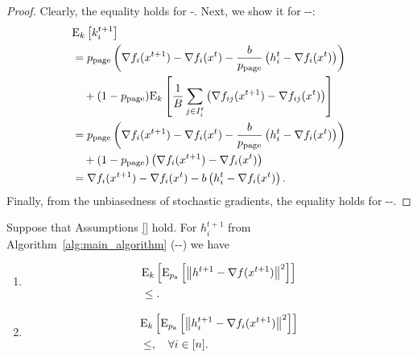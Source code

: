 \documentclass{article}
\begin{document}
\begin{proof}
  Clearly, the equality holds for -. Next, we show it for --:
  \begin{align*}
    &{\rm E}_{k}\left[k^{t+1}_i\right] \\
    &= p_{\text{page}} \left(\nabla f_i(x^{t+1}) - \nabla f_i(x^{t}) - \frac{b}{p_{\text{page}}} \left(h^t_i - \nabla f_i(x^{t})\right)\right) \\
    &\quad + (1 - p_{\text{page}}) {\rm E}_{k}\left[\frac{1}{B}\sum_{j \in I^t_i}\left(\nabla f_{ij}(x^{t+1}) - \nabla f_{ij}(x^{t})\right)\right] \\
    &= p_{\text{page}} \left(\nabla f_i(x^{t+1}) - \nabla f_i(x^{t}) - \frac{b}{p_{\text{page}}} \left(h^t_i - \nabla f_i(x^{t})\right)\right) \\
    &\quad + (1 - p_{\text{page}}) \left(\nabla f_i(x^{t+1}) - \nabla f_i(x^{t})\right) \\
    &= \nabla f_i(x^{t+1}) - \nabla f_i(x^{t}) - b \left(h^t_i - \nabla f_i(x^{t})\right).
\end{align*}
Finally, from the unbiasedness of stochastic gradients, the equality holds for --.
\end{proof}

\begin{lemma}
  Suppose that Assumptions \ref{} hold. For $h^{t+1}_i$ from Algorithm~\ref{alg:main_algorithm} (--) we have
  \begin{enumerate}
  \item
      \begin{align*}
          &{\rm E}_{k}\left[{\rm E}_{p_{\textnormal{a}}}\left[\left\| h^{t+1} - \nabla f(x^{t+1}) \right\|^2\right]\right] \\
          & \leq .
      \end{align*}
  \item
      \begin{align*}
          &{\rm E}_{k}\left[{\rm E}_{p_{\textnormal{a}}}\left[\left\| h^{t+1}_i - \nabla f_i(x^{t+1}) \right\|^2\right]\right] \\
          & \leq , \quad \forall i \in [n].
      \end{align*}
  \end{enumerate}
\end{lemma}
\end{document}
